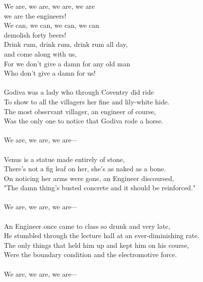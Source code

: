 
We are, we are, we are, we are \\ we are the engineers! \\ We can, we can, we can, we can \\ demolish forty beers! \\ Drink rum, drink rum, drink rum all day, \\ and come along with us, \\ For we don't give a damn for any old man \\ Who don't give a damn for us! \\ \hspace{10mm} \\ Godiva was a lady who through Coventry did ride \\ To show to all the villagers her fine and lily-white hide. \\ The most observant villager, an engineer of course, \\ Was the only one to notice that Godiva rode a horse. \\ \hspace{10mm} \\ We are, we are, we are$\cdots$ \\ \hspace{10mm} \\ Venus is a statue made entirely of stone, \\ There's not a fig leaf on her, she's as naked as a bone. \\ On noticing her arms were gone, an Engineer discoursed, \\ "The damn thing's busted concrete and it should be reinforced." \\ \hspace{10mm} \\ We are, we are, we are$\cdots$ \\ \hspace{10mm} \\ An Engineer once came to class so drunk and very late, \\ He stumbled through the lecture hall at an ever-diminishing rate. \\ The only things that held him up and kept him on his course, \\ Were the boundary condition and the electromotive force. \\ \hspace{10mm} \\ We are, we are, we are$\cdots$